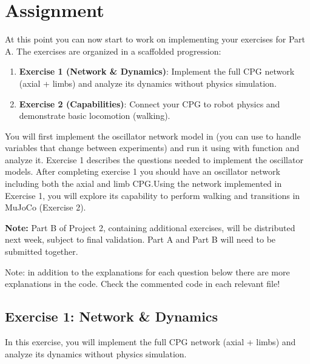 \documentclass{cmc}
\begin{document}

\newpage
\section {Assignment}
At this point you can now start to work on implementing your exercises for Part A.
The exercises are organized in a scaffolded progression:

\begin{enumerate}
\item \textbf{Exercise 1 (Network \& Dynamics)}: Implement the full CPG network (axial + limbs) and analyze its dynamics without physics simulation.
\item \textbf{Exercise 2 (Capabilities)}: Connect your CPG to robot physics and demonstrate basic locomotion (walking).
\end{enumerate}

You will first implement the oscillator network model in  (you can use  to handle variables that change between experiments) and run it using  with  function and analyze it. Exercise 1 describes the questions needed to implement the oscillator models. After completing exercise 1 you should have an oscillator network including both the axial and limb CPG.\@ Using the network implemented in Exercise 1, you will explore its capability to perform walking and transitions in MuJoCo (Exercise 2).

\textbf{Note:} Part B of Project 2, containing additional exercises, will be distributed next week, subject to final validation. Part A and Part B will need to be submitted together.

Note: in addition to the explanations for each question below there are more explanations in the code.
Check the commented code in each relevant file!


\subsection{Exercise 1: Network \& Dynamics}\label{sec:network-implementation}

In this exercise, you will implement the full CPG network (axial + limbs) and analyze its dynamics without physics simulation.
\end{document}
